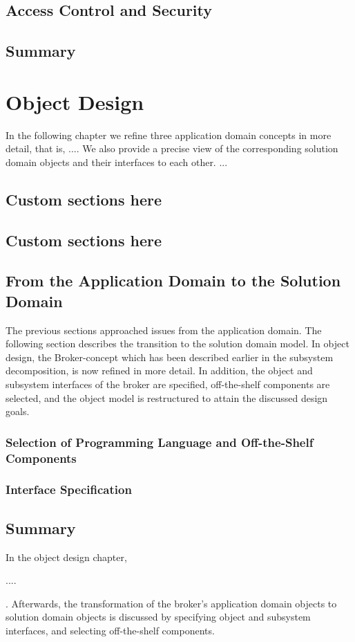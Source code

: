 	\section{Access Control and Security}
	
	
\section{Summary}


\chapter{Object Design}

In the following chapter we refine three application domain concepts in more detail, that is, .... We also provide a precise view of the corresponding solution domain objects and their interfaces to each other. 
...

\section{Custom sections here}
\section{Custom sections here}


		
\section{From the Application Domain to the Solution Domain}

The previous sections approached issues from the application domain. The following section describes the transition to the solution domain model. In object design, the Broker-concept which has been described earlier in the subsystem decomposition, is now refined in more detail. In addition, the object and subsystem interfaces of the broker are specified, off-the-shelf components are selected, and the object model is restructured to attain the discussed design goals.

\subsection{Selection of Programming Language and Off-the-Shelf Components}


\subsection{Interface Specification}



\section{Summary}

In the object design chapter, 

....

. Afterwards, the transformation of the broker's application domain objects to solution domain objects is discussed by specifying object and subsystem interfaces, and selecting off-the-shelf components.
